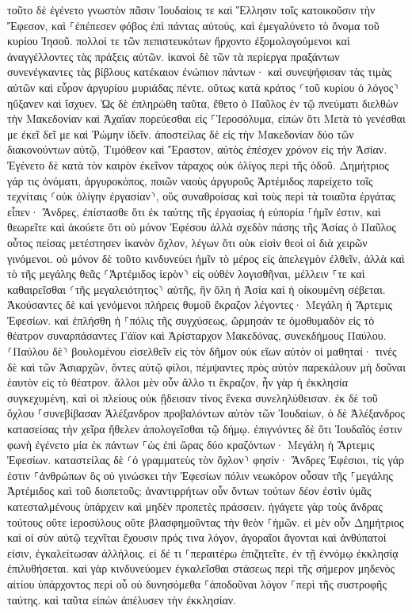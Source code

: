 \documentclass[twoside, 9pt]{extreport}
\begin{document}
τοῦτο δὲ ἐγένετο γνωστὸν πᾶσιν Ἰουδαίοις τε καὶ Ἕλλησιν τοῖς κατοικοῦσιν τὴν Ἔφεσον, καὶ ⸀ἐπέπεσεν φόβος ἐπὶ πάντας αὐτούς, καὶ ἐμεγαλύνετο τὸ ὄνομα τοῦ κυρίου Ἰησοῦ. 
πολλοί τε τῶν πεπιστευκότων ἤρχοντο ἐξομολογούμενοι καὶ ἀναγγέλλοντες τὰς πράξεις αὐτῶν. 
ἱκανοὶ δὲ τῶν τὰ περίεργα πραξάντων συνενέγκαντες τὰς βίβλους κατέκαιον ἐνώπιον πάντων· καὶ συνεψήφισαν τὰς τιμὰς αὐτῶν καὶ εὗρον ἀργυρίου μυριάδας πέντε. 
οὕτως κατὰ κράτος ⸂τοῦ κυρίου ὁ λόγος⸃ ηὔξανεν καὶ ἴσχυεν. 
Ὡς δὲ ἐπληρώθη ταῦτα, ἔθετο ὁ Παῦλος ἐν τῷ πνεύματι διελθὼν τὴν Μακεδονίαν καὶ Ἀχαΐαν πορεύεσθαι εἰς ⸀Ἱεροσόλυμα, εἰπὼν ὅτι Μετὰ τὸ γενέσθαι με ἐκεῖ δεῖ με καὶ Ῥώμην ἰδεῖν. 
ἀποστείλας δὲ εἰς τὴν Μακεδονίαν δύο τῶν διακονούντων αὐτῷ, Τιμόθεον καὶ Ἔραστον, αὐτὸς ἐπέσχεν χρόνον εἰς τὴν Ἀσίαν. 
Ἐγένετο δὲ κατὰ τὸν καιρὸν ἐκεῖνον τάραχος οὐκ ὀλίγος περὶ τῆς ὁδοῦ. 
Δημήτριος γάρ τις ὀνόματι, ἀργυροκόπος, ποιῶν ναοὺς ἀργυροῦς Ἀρτέμιδος παρείχετο τοῖς τεχνίταις ⸂οὐκ ὀλίγην ἐργασίαν⸃, 
οὓς συναθροίσας καὶ τοὺς περὶ τὰ τοιαῦτα ἐργάτας εἶπεν· Ἄνδρες, ἐπίστασθε ὅτι ἐκ ταύτης τῆς ἐργασίας ἡ εὐπορία ⸀ἡμῖν ἐστιν, 
καὶ θεωρεῖτε καὶ ἀκούετε ὅτι οὐ μόνον Ἐφέσου ἀλλὰ σχεδὸν πάσης τῆς Ἀσίας ὁ Παῦλος οὗτος πείσας μετέστησεν ἱκανὸν ὄχλον, λέγων ὅτι οὐκ εἰσὶν θεοὶ οἱ διὰ χειρῶν γινόμενοι. 
οὐ μόνον δὲ τοῦτο κινδυνεύει ἡμῖν τὸ μέρος εἰς ἀπελεγμὸν ἐλθεῖν, ἀλλὰ καὶ τὸ τῆς μεγάλης θεᾶς ⸂Ἀρτέμιδος ἱερὸν⸃ εἰς οὐθὲν λογισθῆναι, μέλλειν ⸀τε καὶ καθαιρεῖσθαι ⸂τῆς μεγαλειότητος⸃ αὐτῆς, ἣν ὅλη ἡ Ἀσία καὶ ἡ οἰκουμένη σέβεται. 
Ἀκούσαντες δὲ καὶ γενόμενοι πλήρεις θυμοῦ ἔκραζον λέγοντες· Μεγάλη ἡ Ἄρτεμις Ἐφεσίων. 
καὶ ἐπλήσθη ἡ ⸀πόλις τῆς συγχύσεως, ὥρμησάν τε ὁμοθυμαδὸν εἰς τὸ θέατρον συναρπάσαντες Γάϊον καὶ Ἀρίσταρχον Μακεδόνας, συνεκδήμους Παύλου. 
⸂Παύλου δὲ⸃ βουλομένου εἰσελθεῖν εἰς τὸν δῆμον οὐκ εἴων αὐτὸν οἱ μαθηταί· 
τινὲς δὲ καὶ τῶν Ἀσιαρχῶν, ὄντες αὐτῷ φίλοι, πέμψαντες πρὸς αὐτὸν παρεκάλουν μὴ δοῦναι ἑαυτὸν εἰς τὸ θέατρον. 
ἄλλοι μὲν οὖν ἄλλο τι ἔκραζον, ἦν γὰρ ἡ ἐκκλησία συγκεχυμένη, καὶ οἱ πλείους οὐκ ᾔδεισαν τίνος ἕνεκα συνεληλύθεισαν. 
ἐκ δὲ τοῦ ὄχλου ⸀συνεβίβασαν Ἀλέξανδρον προβαλόντων αὐτὸν τῶν Ἰουδαίων, ὁ δὲ Ἀλέξανδρος κατασείσας τὴν χεῖρα ἤθελεν ἀπολογεῖσθαι τῷ δήμῳ. 
ἐπιγνόντες δὲ ὅτι Ἰουδαῖός ἐστιν φωνὴ ἐγένετο μία ἐκ πάντων ⸀ὡς ἐπὶ ὥρας δύο κραζόντων· Μεγάλη ἡ Ἄρτεμις Ἐφεσίων. 
καταστείλας δὲ ⸂ὁ γραμματεὺς τὸν ὄχλον⸃ φησίν· Ἄνδρες Ἐφέσιοι, τίς γάρ ἐστιν ⸀ἀνθρώπων ὃς οὐ γινώσκει τὴν Ἐφεσίων πόλιν νεωκόρον οὖσαν τῆς ⸀μεγάλης Ἀρτέμιδος καὶ τοῦ διοπετοῦς; 
ἀναντιρρήτων οὖν ὄντων τούτων δέον ἐστὶν ὑμᾶς κατεσταλμένους ὑπάρχειν καὶ μηδὲν προπετὲς πράσσειν. 
ἠγάγετε γὰρ τοὺς ἄνδρας τούτους οὔτε ἱεροσύλους οὔτε βλασφημοῦντας τὴν θεὸν ⸀ἡμῶν. 
εἰ μὲν οὖν Δημήτριος καὶ οἱ σὺν αὐτῷ τεχνῖται ἔχουσιν πρός τινα λόγον, ἀγοραῖοι ἄγονται καὶ ἀνθύπατοί εἰσιν, ἐγκαλείτωσαν ἀλλήλοις. 
εἰ δέ τι ⸀περαιτέρω ἐπιζητεῖτε, ἐν τῇ ἐννόμῳ ἐκκλησίᾳ ἐπιλυθήσεται. 
καὶ γὰρ κινδυνεύομεν ἐγκαλεῖσθαι στάσεως περὶ τῆς σήμερον μηδενὸς αἰτίου ὑπάρχοντος περὶ οὗ οὐ δυνησόμεθα ⸀ἀποδοῦναι λόγον ⸀περὶ τῆς συστροφῆς ταύτης. καὶ ταῦτα εἰπὼν ἀπέλυσεν τὴν ἐκκλησίαν. 
\end{document}
